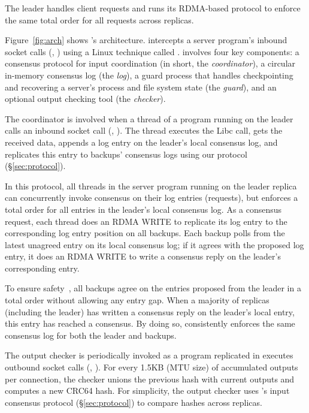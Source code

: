 The \xxx leader handles client requests and runs its RDMA-based protocol to 
enforce the same total order for all requests across replicas.

Figure~\ref{fig:arch} shows \xxx's architecture. \xxx intercepts a server 
program's inbound socket calls (\eg, \recv) using a Linux technique called 
\ldpreload. \xxx involves four key components: a \paxos consensus protocol for 
input coordination (in short, the \emph{coordinator}), a circular in-memory 
consensus log (the \emph{log}), a guard process that handles checkpointing 
and recovering a server's process and file system state (the 
\emph{guard}), and an optional output checking tool (the \emph{checker}).

The coordinator is involved when a thread of a program running on the \xxx 
leader calls an inbound socket call (\eg, \recv). The thread executes the 
Libc call, gets the received data, appends a log entry on the leader's local 
consensus log, and replicates this entry to backups' consensus logs using our 
\paxos protocol (\S\ref{sec:protocol}).

In this protocol, all threads in the server program running on the leader 
replica can concurrently invoke consensus on their log entries (requests), but 
\xxx enforces a total order for all entries in the leader's local consensus 
log. As a consensus request, each thread does an RDMA WRITE to replicate its 
log entry to the corresponding log entry position on all \xxx backups. Each 
\xxx backup polls from the latest unagreed entry on its local consensus log; 
if it agrees with the proposed log entry, it does an RDMA WRITE to write a 
consensus reply on the leader's corresponding entry.

To ensure \paxos safety~\cite{paxos:practical}, all \xxx backups agree on the 
entries proposed from the leader in a total order without allowing any entry 
gap. When a majority of replicas (including the leader) has written a consensus 
reply on the leader's local entry, this entry has reached a consensus. By doing 
so, \xxx consistently enforces the same consensus log for both the leader and
backups.

The output checker is periodically invoked as a program replicated in \xxx 
executes outbound socket calls (\eg, \send). For every 1.5KB (MTU size) of 
accumulated outputs per connection, the checker unions the previous hash with 
current outputs and computes a new CRC64 hash. For simplicity, the output 
checker uses \xxx's input consensus protocol (\S\ref{sec:protocol}) to compare 
hashes across replicas.
